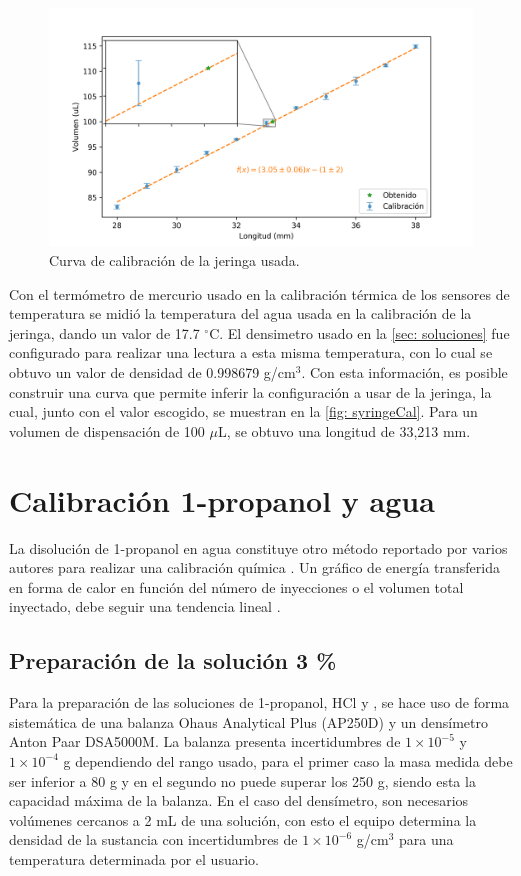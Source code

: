 	\begin{figure}[h!]
		\centering
		\includegraphics[width=\linewidth]{../Data/Syringe/syringe_cal.png}
		\caption{Curva de calibraci\'on de la jeringa usada.}
		\label{fig: syringeCal}
	\end{figure}
	
	Con el termómetro de mercurio usado en la calibración térmica de los sensores de temperatura se midió la temperatura del agua usada en la calibración de la jeringa, dando un valor de 17.7 $^\circ$C. El densimetro usado en la \autoref{sec: soluciones} fue configurado para realizar una lectura a esta misma temperatura, con lo cual se obtuvo un valor de densidad de 0.998679 g/cm$^3$. Con esta información, es posible construir una curva que permite inferir la configuración a usar de la jeringa, la cual, junto con el valor escogido, se muestran en la \autoref{fig: syringeCal}. Para un volumen de dispensación de 100 $\mu$L, se obtuvo una longitud de 33,213 mm.	

\section{Calibraci\'on 1-propanol y agua}
	La disoluci\'on de 1-propanol en agua constituye otro m\'etodo reportado por varios autores para realizar una calibraci\'on qu\'imica \cite{briggner1991test, nanoitc, demarse2011calibration, adao2012chemical}. Un gr\'afico de energ\'ia transferida en forma de calor en funci\'on del n\'umero de inyecciones o el volumen total inyectado, debe seguir una tendencia lineal \cite{demarse2011calibration, nanoitc, adao2012chemical}. 
	
\subsection{Preparaci\'on de la soluci\'on 3 \%}
	Para la preparaci\'on de las soluciones de 1-propanol, HCl y , se hace uso de forma sistem\'atica de una balanza Ohaus Analytical Plus (AP250D) y un dens\'imetro Anton Paar DSA5000M. La balanza presenta incertidumbres de $1\times10^{-5}$ y $1\times10^{-4}$ g dependiendo del rango usado, para el primer caso la masa medida debe ser inferior a 80 g y en el segundo no puede superar los 250 g, siendo esta la capacidad máxima de la balanza. En el caso del densímetro, son necesarios volúmenes cercanos a 2 mL de una soluci\'on, con esto el equipo determina la densidad de la sustancia con incertidumbres de $1\times10^{-6}$ g/cm$^{3}$ para una temperatura determinada por el usuario.

